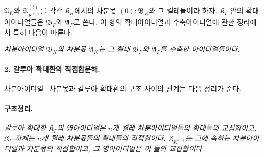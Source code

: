 \(\mathfrak A_K\)와 \(\mathfrak A_{K^{(i)}}^{(i)}\)를 각각 \(\mathfrak K_K\)에서의 차분몫 \((0):\mathfrak B_K\)와 그 켤레들이라 하자. \(\mathfrak K_\Gamma\) 안의 확대아이디얼들은 \(\mathfrak B_\Gamma\)와 \(\mathfrak A_\Gamma\)로 쓴다. 이 항의 확대아이디얼과 수축아이디얼에 관한 정리에서 특히 다음이 따른다.

\emph{차분아이디얼 \(\mathfrak B_K\)와 차분몫 \(\mathfrak A_K\)는 그 확대 \(\mathfrak B_\Gamma\)와 \(\mathfrak A_\Gamma\)를 수축한 아이디얼들이다.}

\paragraph{2. 갈루아 확대환의 직접합분해.}
차분아이디얼·차분몫과 갈루아 확대환의 구조 사이의 관계는 다음 정리가 준다.

\paragraph{구조정리.}
\emph{갈루아 확대환 \(\mathfrak K_\Gamma\)의 영아이디얼은 \(n\)개 켤레 차분아이디얼들의 확대들의 교집합이고, \(\mathfrak K_\Gamma\) 자체는 \(n\)개 켤레 차분몫들의 확대들의 직접합이다. \(\mathfrak K_{K^{(i)}}\)는 그에 속하는 차분아이디얼과 차분몫의 직접합이고, 그 영아이디얼은 이 둘의 교집합이다.}

